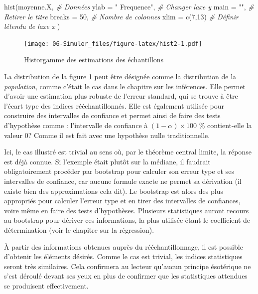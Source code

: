 \documentclass[
]{book}
\newenvironment{Shaded}{}{}
\newcommand{\AttributeTok}[1]{#1}
\newcommand{\CommentTok}[1]{\textit{#1}}
\newcommand{\DecValTok}[1]{#1}
\newcommand{\FunctionTok}[1]{#1}
\newcommand{\NormalTok}[1]{#1}
\newcommand{\StringTok}[1]{#1}
\begin{document}
\begin{Shaded}
\begin{Highlighting}[]
\FunctionTok{hist}\NormalTok{(moyenne.X,              }\CommentTok{\# Données}
     \AttributeTok{ylab =} \StringTok{" Frequence"}\NormalTok{,    }\CommentTok{\# Changer l\textquotesingle{}axe y}
     \AttributeTok{main =} \StringTok{""}\NormalTok{,              }\CommentTok{\# Retirer le titre}
     \AttributeTok{breaks =} \DecValTok{50}\NormalTok{,            }\CommentTok{\# Nombre de colonnes}
     \AttributeTok{xlim =} \FunctionTok{c}\NormalTok{(}\DecValTok{7}\NormalTok{,}\DecValTok{13}\NormalTok{)          }\CommentTok{\# Définir l\textquotesingle{}étendu de l\textquotesingle{}axe x}
\NormalTok{)}
\end{Highlighting}
\end{Shaded}

\begin{figure}
\centering
\texttt{[image: 06-Simuler\_files/figure-latex/hist2-1.pdf]}
\caption{\label{fig:hist2}Historgamme des estimations des échantillons}
\end{figure}

La distribution de la figure \ref{fig:hist2} peut être désignée comme la distribution de la \emph{population}, comme c'était le cas dans le chapitre sur les inférences. Elle permet d'avoir une estimation plus robuste de l'erreur standard, qui se trouve à être l'écart type des indices rééchantillonnés. Elle est également utilisée pour construire des intervalles de confiance et permet ainsi de faire des tests d'hypothèse comme : l'intervalle de confiance à \((1-\alpha) \times 100\) \% contient-elle la valeur 0? Comme il est fait avec une hypothèse nulle traditionnelle.

Ici, le cas illustré est trivial au sens où, par le théorème central limite, la réponse est déjà connue. Si l'exemple était plutôt sur la médiane, il faudrait obligatoirement procéder par bootstrap pour calculer son erreur type et ses intervalles de confiance, car aucune formule exacte ne permet sa dérivation (il existe bien des approximations cela dit). Le bootstrap est alors des plus appropriés pour calculer l'erreur type et en tirer des intervalles de confiances, voire même en faire des tests d'hypothèses. Plusieurs statistiques auront recours au bootstrap pour dériver ces informations, la plus utilisée étant le coefficient de détermination (voir le chapitre sur la régression).

À partir des informations obtenues auprès du rééchantillonnage, il est possible d'obtenir les éléments désirés. Comme le cas est trivial, les indices statistiques seront très similaires. Cela confirmera au lecteur qu'aucun principe ésotérique ne s'est déroulé devant ses yeux en plus de confirmer que les statistiques attendues se produisent effectivement.
\end{document}
